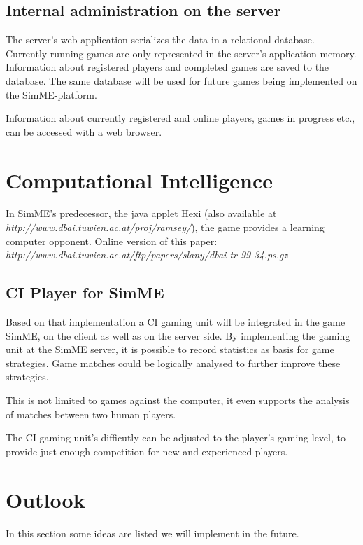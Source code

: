 	\subsection{Internal administration on the server}

		The server's web application serializes the data in a relational
		database. Currently running games are only represented in the server's
		application memory. Information about registered players and completed
		games are saved to the database. The same database will be used for
		future games being implemented on the SimME-platform.

		Information about currently registered and online players, games in
		progress etc., can be accessed with a web browser.


\section{Computational Intelligence} \label{sec:ci}

	In SimME's predecessor, the java applet Hexi \cite{slany_paper} (also
	available at \textit{http://www.dbai.tuwien.ac.at/proj/ramsey/}), the game
	provides a learning computer opponent. Online version of this paper:
	\textit{http://www.dbai.tuwien.ac.at/ftp/papers/slany/dbai-tr-99-34.ps.gz}

	\subsection{CI Player for SimME}

		Based on that implementation a CI gaming unit will be integrated in the
		game SimME, on the client as well as on the server side. By implementing
		the gaming unit at the SimME server, it is possible to record statistics
		as basis for game strategies. Game matches could be logically analysed
		to further improve these strategies.

		This is not limited to games against the computer, it even supports the
		analysis of matches between two human players.

		The CI gaming unit's difficutly can be adjusted to the player's gaming
		level, to provide just enough competition for new and experienced
		players.


\section{Outlook}

	In this section some ideas are listed we will implement in the future.

